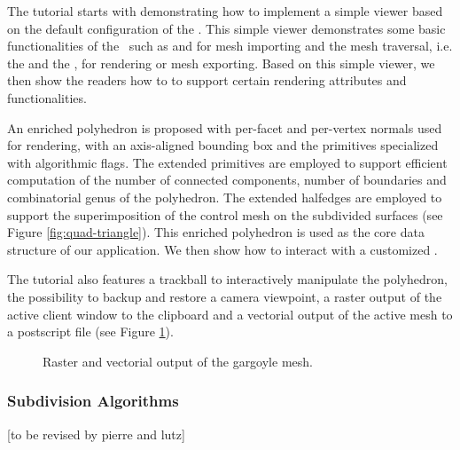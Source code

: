\documentclass[twocolumn]{article}
\begin{document}
The tutorial starts with demonstrating how to implement a simple
viewer based on the default configuration of the \cgalpoly . This
simple viewer demonstrates some basic functionalities of the
\cgalpoly\ such as  and  
for mesh importing and the mesh traversal, i.e. the 
and the , for rendering or mesh exporting.  Based
on this simple viewer, we then show the readers how to
 to support certain rendering attributes and 
functionalities.

An enriched polyhedron is proposed with per-facet and per-vertex
normals used for rendering, with an axis-aligned bounding box and the
primitives specialized with algorithmic flags. The extended primitives
are employed to support efficient computation of the number of
connected components, number of boundaries and combinatorial genus of
the polyhedron. The extended halfedges are employed to support the
superimposition of the control mesh on the subdivided surfaces (see
Figure \ref{fig:quad-triangle}). This enriched polyhedron is used as
the core data structure of our application.  We then show how to
interact with a customized \poly.

The tutorial also features a trackball to interactively manipulate the
polyhedron, the possibility to backup and restore a camera viewpoint,
a raster output of the active client window to the clipboard and a
vectorial output of the active mesh to a postscript file (see Figure
\ref{fig:gargoyle}).

\begin{figure}[t]
    \caption{Raster and vectorial output of the gargoyle mesh.}
    \label{fig:gargoyle}
\end{figure}

\subsubsection*{Subdivision Algorithms}
[to be revised by pierre and lutz]
\end{document}
